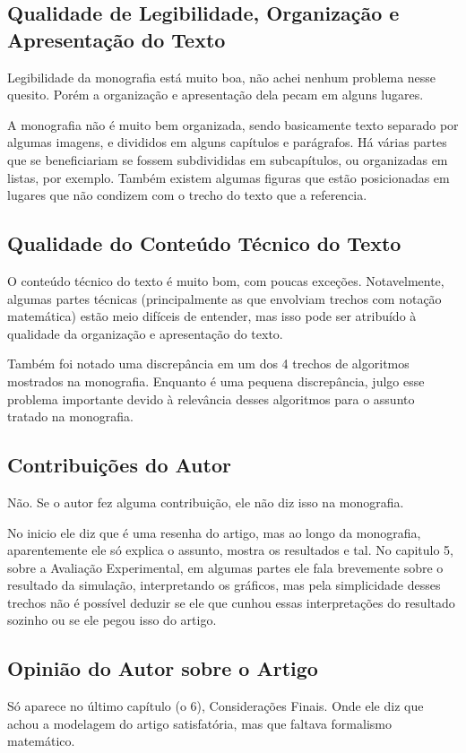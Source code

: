 \documentclass[a4paper,11pt]{article}
\begin{document}
\subsection{Qualidade de Legibilidade, Organização e Apresentação do Texto}
Legibilidade da monografia está muito boa, não achei nenhum problema nesse quesito. Porém
a organização e apresentação dela pecam em alguns lugares.

A monografia não é muito bem organizada, sendo basicamente texto separado por algumas imagens,
e divididos em alguns capítulos e parágrafos. Há várias partes que se beneficiariam se fossem subdivididas
em subcapítulos, ou organizadas em listas, por exemplo. Também existem algumas figuras que estão
posicionadas em lugares que não condizem com o trecho do texto que a referencia.

\subsection{Qualidade do Conteúdo Técnico do Texto}
O conteúdo técnico do texto é muito bom, com poucas exceções. Notavelmente, algumas partes técnicas
(principalmente as que envolviam trechos com notação matemática) estão meio difíceis de entender,
mas isso pode ser atribuído à qualidade da organização e apresentação do texto.

Também foi notado uma discrepância em um dos 4 trechos de algoritmos mostrados na monografia. Enquanto
é uma pequena discrepância, julgo esse problema importante devido à relevância desses algoritmos para
o assunto tratado na monografia.

\subsection{Contribuições do Autor}
Não. Se o autor fez alguma contribuição, ele não diz isso na monografia.

No inicio ele diz que é uma resenha do artigo, mas ao longo da monografia, 
aparentemente ele só explica o assunto, mostra os resultados e tal. No capitulo 5,
sobre a Avaliação Experimental, em algumas partes ele fala brevemente sobre o resultado da simulação,
interpretando os gráficos, mas pela simplicidade desses trechos não é possível deduzir se ele
que cunhou essas interpretações do resultado sozinho ou se ele pegou isso do artigo.

\subsection{Opinião do Autor sobre o Artigo}
Só aparece no último capítulo (o 6), Considerações Finais. Onde ele diz que achou a modelagem
do artigo satisfatória, mas que faltava formalismo matemático.
\end{document}
